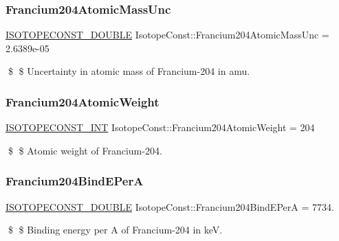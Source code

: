 \subsubsection{\texorpdfstring{Francium204\+Atomic\+Mass\+Unc}{Francium204AtomicMassUnc}}
{\footnotesize\ttfamily \mbox{\hyperlink{group___isotope_const-_macros_ga8f45a7272ce02c0b4c65c44636ed719a}{I\+S\+O\+T\+O\+P\+E\+C\+O\+N\+S\+T\+\_\+\+D\+O\+U\+B\+LE}} Isotope\+Const\+::\+Francium204\+Atomic\+Mass\+Unc = 2.\+6389e-\/05}

\$ \$ Uncertainty in atomic mass of Francium-\/204 in amu. \mbox{\label{group___isotope_const-_francium-_fr204_ga5ad847826feca8f3033d99f7bfabb634}} 
\subsubsection{\texorpdfstring{Francium204\+Atomic\+Weight}{Francium204AtomicWeight}}
{\footnotesize\ttfamily \mbox{\hyperlink{group___isotope_const-_macros_ga5f18360b3e99483a35c32d789e62621c}{I\+S\+O\+T\+O\+P\+E\+C\+O\+N\+S\+T\+\_\+\+I\+NT}} Isotope\+Const\+::\+Francium204\+Atomic\+Weight = 204}

\$ \$ Atomic weight of Francium-\/204. \mbox{\label{group___isotope_const-_francium-_fr204_gaea11e2f256dc5cdf3d7db13ff67b9bfc}} 
\subsubsection{\texorpdfstring{Francium204\+Bind\+E\+PerA}{Francium204BindEPerA}}
{\footnotesize\ttfamily \mbox{\hyperlink{group___isotope_const-_macros_ga8f45a7272ce02c0b4c65c44636ed719a}{I\+S\+O\+T\+O\+P\+E\+C\+O\+N\+S\+T\+\_\+\+D\+O\+U\+B\+LE}} Isotope\+Const\+::\+Francium204\+Bind\+E\+PerA = 7734.}

\$ \$ Binding energy per A of Francium-\/204 in keV. \mbox{\label{group___isotope_const-_francium-_fr204_ga4806e929620ef58ee0ee6e43e40e3aae}} 
